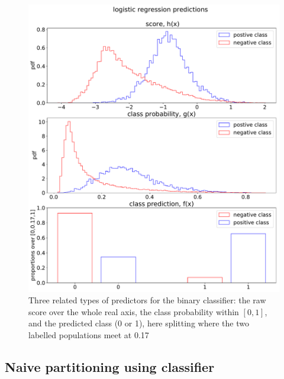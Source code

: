 \documentclass[12pt,a4paper]{article}
\begin{document}
\begin{figure}[H]
    \centering
    \includegraphics[width=\textwidth]{pics/torch_lr_predictions.pdf}
    \caption{Three related types of predictors for the binary classifier: the raw score over the whole real axis, the class probability within $[0,1]$, and the predicted class (0 or 1), here splitting where the two labelled populations meet at 0.17}
    \label{fig:fghpredictions}
\end{figure}


\subsection{Naive partitioning using classifier}
\end{document}
